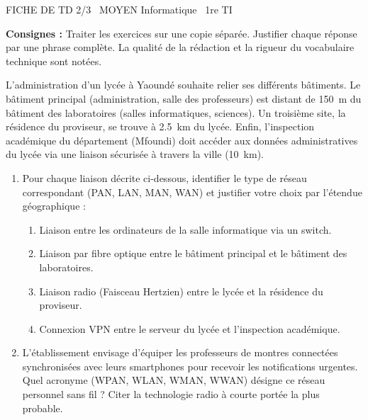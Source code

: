 \documentclass[11pt]{article}
\begin{document}
\begin{tcolorbox}[enhanced,colback=popink,colframe=popink,arc=10pt,boxrule=0pt,left=12pt,right=12pt,top=9pt,bottom=9pt]
{\color{white}\popxbold\small FICHE DE TD 2/3 \textbullet\ MOYEN \hfill Informatique \textbullet\ 1re TI\par}
\end{tcolorbox}
\vspace{4pt}
\noindent\textbf{Consignes :} Traiter les exercices sur une copie séparée. Justifier chaque réponse par une phrase complète. La qualité de la rédaction et la rigueur du vocabulaire technique sont notées.

\begin{exercice}
L'administration d'un lycée à Yaoundé souhaite relier ses différents bâtiments. Le bâtiment principal (administration, salle des professeurs) est distant de \SI{150}{m} du bâtiment des laboratoires (salles informatiques, sciences). Un troisième site, la résidence du proviseur, se trouve à \SI{2,5}{km} du lycée. Enfin, l'inspection académique du département (Mfoundi) doit accéder aux données administratives du lycée via une liaison sécurisée à travers la ville (\approx \SI{10}{km}).

\begin{enumerate}
    \item Pour chaque liaison décrite ci-dessous, identifier le type de réseau correspondant (PAN, LAN, MAN, WAN) et justifier votre choix par l'étendue géographique :
    \begin{enumerate}
        \item Liaison entre les ordinateurs de la salle informatique via un switch.
        \item Liaison par fibre optique entre le bâtiment principal et le bâtiment des laboratoires.
        \item Liaison radio (Faisceau Hertzien) entre le lycée et la résidence du proviseur.
        \item Connexion VPN entre le serveur du lycée et l'inspection académique.
    \end{enumerate}
    \item L'établissement envisage d'équiper les professeurs de montres connectées synchronisées avec leurs smartphones pour recevoir les notifications urgentes. Quel acronyme (WPAN, WLAN, WMAN, WWAN) désigne ce réseau personnel sans fil ? Citer la technologie radio à courte portée la plus probable.
\end{enumerate}
\end{exercice}
\end{document}
